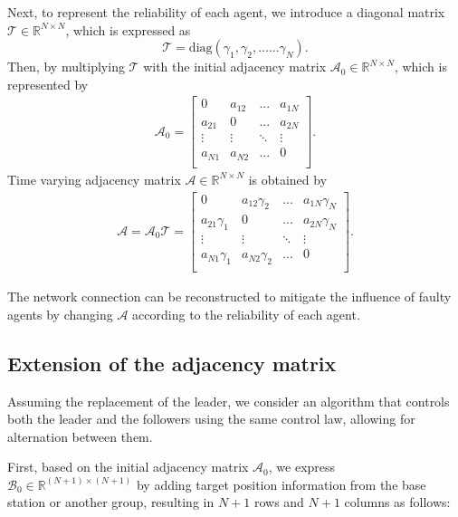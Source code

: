 \documentclass[a4paper,fleqn,10pt,twocolumn]{SICE_ISCS}
\begin{document}
Next, to represent the reliability of each agent, we introduce a diagonal matrix \({\mathcal{T}} \in {\mathbb{R}}^{N \times N}\), which is expressed as 
\begin{equation}
	{\mathcal{T}}={\mathrm{diag}}(\gamma_1,\gamma_2,......\gamma_N).
\end{equation}
Then, by multiplying \(\mathcal{T}\) with the initial adjacency matrix \({\mathcal{A}}_0 \in {\mathbb{R}}^{N \times N}\), which is represented by
\begin{align}
	{\mathcal{A}}_0=
	\begin{bmatrix}
		0 & a_{12} & ... & a_{1N}\\
		a_{21} & 0 & ... & a_{2N}\\
		\vdots & \vdots & \ddots & \vdots\\
		a_{N1} & a_{N2} & ... & 0\\ 
	\end{bmatrix}.
\end{align}
Time varying adjacency matrix \({\mathcal{A}} \in {\mathbb{R}}^{N \times N}\) is obtained by
\begin{align}
	{\mathcal{A}}	= {\mathcal{A}}_0 {\mathcal{T}} =
	\begin{bmatrix}
		0 & a_{12}\gamma_2 & ... & a_{1N}\gamma_{N}\\
		a_{21}\gamma_1 & 0 & ... & a_{2N}\gamma_{N}\\
		\vdots & \vdots & \ddots & \vdots\\
		a_{N1}\gamma_1 & a_{N2}\gamma_2 &... & 0\\ 
	\end{bmatrix}.
\end{align}

The network connection can be reconstructed to mitigate the influence of faulty agents by changing \({\mathcal{A}}\) according to the reliability of each agent.

\subsection{Extension of the adjacency matrix}
Assuming the replacement of the leader, we consider an algorithm that controls both the leader and the followers using the same control law, allowing for alternation between them.


First, based on the initial adjacency matrix \({\mathcal{A}}_0\), we express \({{\mathcal{B}}}_0 \in {{\mathbb{R}}}^{(N+1) \times (N+1)}\) by adding target position information from the base station or another group, resulting in \(N+1\) rows and \(N+1\) columns as follows:
\end{document}
